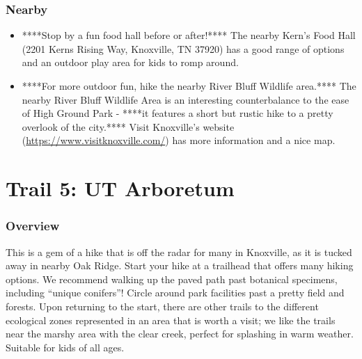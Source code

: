 \documentclass[
  letterpaper,
  DIV=11,
  numbers=noendperiod]{scrreprt}
\providecommand{\tightlist}{%
  \setlength{\itemsep}{0pt}\setlength{\parskip}{0pt}}\usepackage{longtable,booktabs,array}
\begin{document}
\subsection{Nearby}\label{nearby-3}

\begin{itemize}
\tightlist
\item
  ****Stop by a fun food hall before or after!**** The nearby Kern's
  Food Hall (2201 Kerns Rising Way, Knoxville, TN 37920) has a good
  range of options and an outdoor play area for kids to romp around.
\item
  ****For more outdoor fun, hike the nearby River Bluff Wildlife
  area.**** The nearby River Bluff Wildlife Area is an interesting
  counterbalance to the ease of High Ground Park - ****it features a
  short but rustic hike to a pretty overlook of the city.**** Visit
  Knoxville's website (\url{https://www.visitknoxville.com/}) has more
  information and a nice map.
\end{itemize}

\chapter{Trail 5: UT Arboretum}\label{trail-5-ut-arboretum}

\subsection{Overview}\label{overview-5}

This is a gem of a hike that is off the radar for many in Knoxville, as
it is tucked away in nearby Oak Ridge. Start your hike at a trailhead
that offers many hiking options. We recommend walking up the paved path
past botanical specimens, including ``unique conifers''! Circle around
park facilities past a pretty field and forests. Upon returning to the
start, there are other trails to the different ecological zones
represented in an area that is worth a visit; we like the trails near
the marshy area with the clear creek, perfect for splashing in warm
weather. Suitable for kids of all ages.
\end{document}
